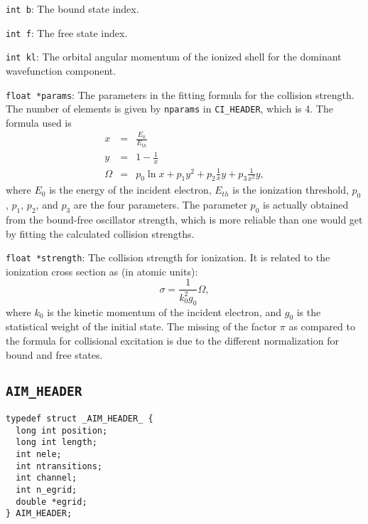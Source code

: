 \begin{dbdesc}
\item[\texttt{int b}:] The bound state index.
\item[\texttt{int f}:] The free state index.
\item[\texttt{int kl}:] The orbital angular momentum of the ionized shell for
the dominant wavefunction component.
\item[\texttt{float *params}:] The parameters in the fitting formula for the
collision strength. The number of elements is given by \texttt{nparams} in
\texttt{CI\_HEADER}, which is 4. The formula used is
\begin{eqnarray}
x &=& \frac{E_0}{E_{th}} \nonumber\\
y &=& 1-\frac{1}{x} \nonumber\\
\Omega &=& p_0\ln x + p_1y^2 + p_2\frac{1}{x}y + p_3\frac{1}{x^2}y,
\end{eqnarray}
where $E_0$ is the energy of the incident electron, $E_{th}$ is the ionization
threshold, $p_0$, $p_1$, $p_2$, and $p_3$ are the four parameters. The parameter
$p_0$ is actually obtained from the bound-free oscillator strength, which is
more reliable than one would get by fitting the calculated collision strengths.
\item[\texttt{float *strength}:] The collision strength for ionization. It is
related to the ionization cross section as (in atomic units):
\begin{equation}
\sigma = \frac{1}{k_0^2g_0}\Omega,
\end{equation}
where ${k_0}$ is the kinetic momentum of the incident electron, and $g_0$ is
the statistical weight of the initial state. The missing of the factor $\pi$
as compared to the formula for collisional excitation is due to the different
normalization for bound and free states.
\end{dbdesc}

\subsection{\texttt{AIM\_HEADER}}
\begin{verbatim}
typedef struct _AIM_HEADER_ {
  long int position;
  long int length;
  int nele;
  int ntransitions;
  int channel;
  int n_egrid;
  double *egrid;
} AIM_HEADER;
\end{verbatim}

